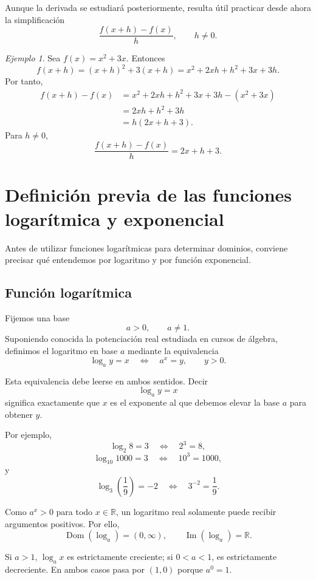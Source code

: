 \documentclass[12pt]{article}
\theoremstyle{remark}
\newtheorem{ejemplo}{Ejemplo}[section]
\newcommand{\R}{\mathbb{R}}
\newcommand{\Dom}{\operatorname{Dom}}
\newcommand{\Ima}{\operatorname{Im}}
\begin{document}
Aunque la derivada se estudiará posteriormente, resulta útil practicar desde
ahora la simplificación
\[
\frac{f(x+h)-f(x)}{h},\qquad h\neq0.
\]

\begin{ejemplo}
Sea $f(x)=x^2+3x$. Entonces
\[
f(x+h)=(x+h)^2+3(x+h)
=x^2+2xh+h^2+3x+3h.
\]
Por tanto,
\begin{align*}
f(x+h)-f(x)
&=x^2+2xh+h^2+3x+3h-(x^2+3x)\\
&=2xh+h^2+3h\\
&=h(2x+h+3).
\end{align*}
Para $h\neq0$,
\[
\frac{f(x+h)-f(x)}{h}=2x+h+3.
\]
\end{ejemplo}


\section{Definición previa de las funciones logarítmica y exponencial}

Antes de utilizar funciones logarítmicas para determinar dominios, conviene
precisar qué entendemos por logaritmo y por función exponencial.

\subsection{Función logarítmica}

Fijemos una base
\[
a>0,\qquad a\neq1.
\]
Suponiendo conocida la potenciación real estudiada en cursos de álgebra,
definimos el logaritmo en base $a$ mediante la equivalencia
\[
\boxed{\log_a y=x\quad\Longleftrightarrow\quad a^x=y},
\qquad y>0.
\]

Esta equivalencia debe leerse en ambos sentidos. Decir
\[
\log_a y=x
\]
significa exactamente que $x$ es el exponente al que debemos elevar la base
$a$ para obtener $y$.

Por ejemplo,
\[
\log_2 8=3
\quad\Longleftrightarrow\quad
2^3=8,
\]
\[
\log_{10}1000=3
\quad\Longleftrightarrow\quad
10^3=1000,
\]
y
\[
\log_3\!\left(\frac19\right)=-2
\quad\Longleftrightarrow\quad
3^{-2}=\frac19.
\]

Como $a^x>0$ para todo $x\in\R$, un logaritmo real solamente puede recibir
argumentos positivos. Por ello,
\[
\boxed{\Dom(\log_a)=(0,\infty)},
\qquad
\boxed{\Ima(\log_a)=\R}.
\]

Si $a>1$, $\log_a x$ es estrictamente creciente; si $0<a<1$, es estrictamente
decreciente. En ambos casos pasa por $(1,0)$ porque $a^0=1$.
\end{document}
